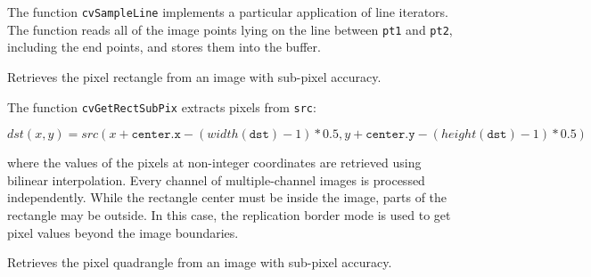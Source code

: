 \begin{description}
\end{description}

The function \texttt{cvSampleLine} implements a particular application of line iterators. The function reads all of the image points lying on the line between \texttt{pt1} and \texttt{pt2}, including the end points, and stores them into the buffer.
\fi

\label{GetRectSubPix}

Retrieves the pixel rectangle from an image with sub-pixel accuracy.
 

\begin{description}
\end{description}

The function \texttt{cvGetRectSubPix} extracts pixels from \texttt{src}:

\[
dst(x, y) = src(x + \texttt{center.x} - (width(\texttt{dst})-1)*0.5, y + \texttt{center.y} - (height(\texttt{dst} )-1)*0.5)
\]

where the values of the pixels at non-integer coordinates are retrieved
using bilinear interpolation. Every channel of multiple-channel
images is processed independently. While the rectangle center
must be inside the image, parts of the rectangle may be
outside. In this case, the replication border mode is used to get
pixel values beyond the image boundaries.

\label{GetQuadrangleSubPix}

Retrieves the pixel quadrangle from an image with sub-pixel accuracy.

